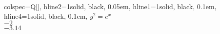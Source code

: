 \begin{table}
\centering
\begin{tblr}[         %
]                     %
{                     %
colspec={Q[]},
hline{2}={1}{solid, black, 0.05em},
hline{1}={1}{solid, black, 0.1em},
hline{4}={1}{solid, black, 0.1em},
}                     %
$y^2 = e^x$ \\
$-2$ \\
$-3.14$ \\
\end{tblr}
\end{table} 
